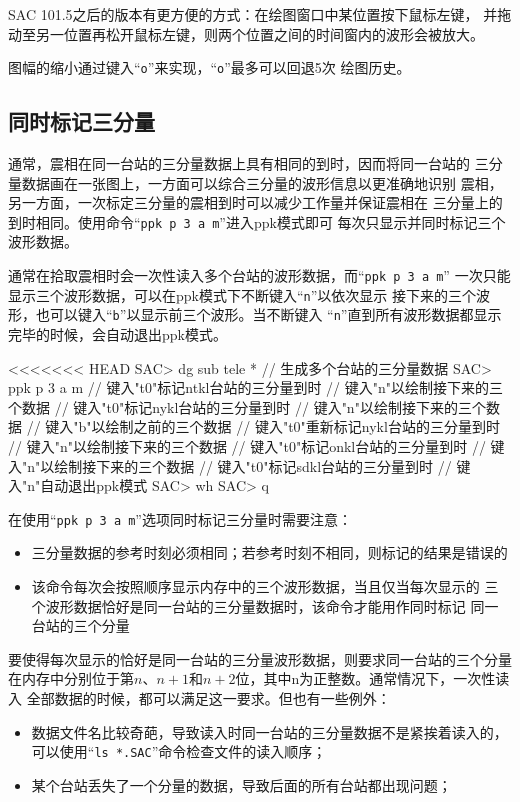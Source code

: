 SAC 101.5之后的版本有更方便的方式：在绘图窗口中某位置按下鼠标左键，
并拖动至另一位置再松开鼠标左键，则两个位置之间的时间窗内的波形会被放大。

图幅的缩小通过键入``\texttt{o}''来实现，``\texttt{o}''最多可以回退5次
绘图历史。

\subsection{同时标记三分量}
通常，震相在同一台站的三分量数据上具有相同的到时，因而将同一台站的
三分量数据画在一张图上，一方面可以综合三分量的波形信息以更准确地识别
震相，另一方面，一次标定三分量的震相到时可以减少工作量并保证震相在
三分量上的到时相同。使用命令``\texttt{ppk p 3 a m}''进入ppk模式即可
每次只显示并同时标记三个波形数据。

通常在拾取震相时会一次性读入多个台站的波形数据，而``\texttt{ppk p 3 a m}''
一次只能显示三个波形数据，可以在ppk模式下不断键入``\texttt{n}''以依次显示
接下来的三个波形，也可以键入``\texttt{b}''以显示前三个波形。当不断键入
``\texttt{n}''直到所有波形数据都显示完毕的时候，会自动退出ppk模式。

\begin{SACCode}
<<<<<<< HEAD
SAC> dg sub tele *       // 生成多个台站的三分量数据
SAC> ppk p 3 a m
// 键入"t0"标记ntkl台站的三分量到时
// 键入"n"以绘制接下来的三个数据
// 键入"t0"标记nykl台站的三分量到时
// 键入"n"以绘制接下来的三个数据
// 键入"b"以绘制之前的三个数据
// 键入"t0"重新标记nykl台站的三分量到时
// 键入"n"以绘制接下来的三个数据
// 键入"t0"标记onkl台站的三分量到时
// 键入"n"以绘制接下来的三个数据
// 键入"t0"标记sdkl台站的三分量到时
// 键入"n"自动退出ppk模式
SAC> wh
SAC> q
\end{SACCode}

在使用``\texttt{ppk p 3 a m}''选项同时标记三分量时需要注意：
\begin{itemize}
\item 三分量数据的参考时刻必须相同；若参考时刻不相同，则标记的结果是错误的
\item 该命令每次会按照顺序显示内存中的三个波形数据，当且仅当每次显示的
    三个波形数据恰好是同一台站的三分量数据时，该命令才能用作同时标记
    同一台站的三个分量
\end{itemize}

要使得每次显示的恰好是同一台站的三分量波形数据，则要求同一台站的三个分量
在内存中分别位于第$n$、$n+1$和$n+2$位，其中n为正整数。通常情况下，一次性读入
全部数据的时候，都可以满足这一要求。但也有一些例外：
\begin{itemize}
\item 数据文件名比较奇葩，导致读入时同一台站的三分量数据不是紧挨着读入的，
    可以使用``\texttt{ls *.SAC}''命令检查文件的读入顺序；
\item 某个台站丢失了一个分量的数据，导致后面的所有台站都出现问题；
\end{itemize}

